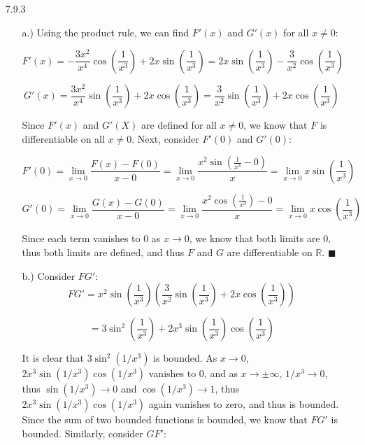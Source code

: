 \documentclass[11pt]{article}
\newcommand{\parens}[1]{\left(#1\right)}             %
\newcommand{\R}{\mathbb{R}}
\newcommand{\lm}[1]{\displaystyle\lim_{#1}}
\begin{document}
\pagestyle{fancy}
\fancyhead{}

\normalsize

\begin{itemize}
    \item [7.9.3] \begin{itemize}
        \item [a.)] Using the product rule, we can find
        $F'(x)$
        and
        $G'(x)$
        for all
        $x\ne0$:

        \[F'(x)
        =-\frac{3x^2}{x^4}\cos\parens{\frac{1}{x^3}}
        +2x\sin\parens{\frac{1}{x^3}}
        =2x\sin\parens{\frac{1}{x^3}}
        -\frac{3}{x^2}\cos\parens{\frac{1}{x^3}}\]

        \[G'(x)=\frac{3x^2}{x^4}\sin\parens{\frac{1}{x^3}}
        +2x\cos\parens{\frac{1}{x^3}}
        =\frac{3}{x^2}\sin\parens{\frac{1}{x^3}}
        +2x\cos\parens{\frac{1}{x^3}}\]

        Since
        $F'(x)$
        and
        $G'(X)$
        are defined for all
        $x\ne 0$,
        we know that
        $F$
        is differentiable on all
        $x\ne 0$.
        Next, consider
        $F'(0)$
        and
        $G'(0)$:

        \[F'(0)
        =\lm{x\to0}\frac{F(x)-F(0)}{x-0}
        =\lm{x\to0}\frac{x^2\sin\parens{\frac{1}{x^3}-0}}{x}
        =\lm{x\to0}x\sin\parens{\frac{1}{x^3}}\]

        \[G'(0)
        =\lm{x\to0}\frac{G(x)-G(0)}{x-0}
        =\lm{x\to0}\frac{x^2\cos\parens{\frac{1}{x^3}}-0}{x}
        =\lm{x\to0}x\cos\parens{\frac{1}{x^3}}\]

        Since each term vanishes to
        $0$
        as
        $x\to0$,
        we know that both limits are
        $0$,
        thus both limits are defined, and thus
        $F$
        and
        $G$
        are differentiable on
        $\R$. 
        $\blacksquare$

        \item [b.)] Consider $FG'$:
        \[FG'
        =x^2\sin\parens{\frac{1}{x^3}}
        \parens{\frac{3}{x^2}\sin\parens{\frac{1}{x^3}}+2x\cos\parens{\frac{1}{x^3}}}\]

        \[=3\sin^2\parens{\frac{1}{x^3}}
        +2x^3\sin\parens{\frac{1}{x^3}}\cos\parens{\frac{1}{x^3}}\]

        It is clear that
        $3\sin^2\parens{1/x^3}$
        is bounded. As
        $x\to0$,
        $2x^3\sin(1/x^3)\cos(1/x^3)$
        vanishes to
        $0$,
        and as
        $x\to\pm\infty$,
        $1/x^3\to0$,
        thus
        $\sin(1/x^3)\to0$
        and
        $\cos(1/x^3)\to1$,
        thus
        $2x^3\sin(1/x^3)\cos(1/x^3)$
        again vanishes to zero, and thus is bounded.
        Since the sum of two bounded functions is bounded, we know that
        $FG'$
        is bounded. Similarly, consider
        $GF'$:
        

\end{itemize}
\end{itemize}
\end{document}
